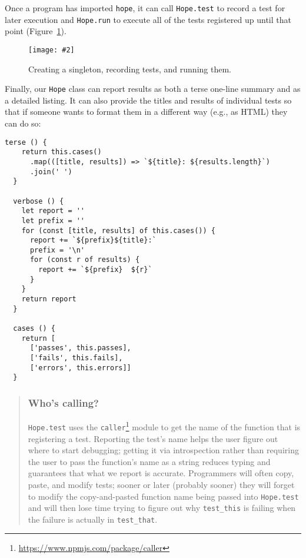 \documentclass[krantzl]{krantz}
\newcommand{\figpdf}[4]{\begin{figure}%
\centering%
\texttt{[image: \#2]}%
\caption{#3}%
\label{#1}%
\end{figure}}
\newcommand{\figref}[1]{Figure~\ref{#1}}
\newenvironment{callout}{\savenotes\begin{tBox}\begin{quotation}\toggletrue{inbox}\renewcommand{\thempfootnote}{\arabic{footnote}}}{\end{quotation}\vspace{\baselineskip}\end{tBox}\togglefalse{inbox}\spewnotes}
\newcommand{\hreffoot}[2]{{#1}\footnote{\href{#2}{#2}}}
\begin{document}
Once a program has imported \texttt{hope},
it can call \texttt{Hope.test} to record a test for later execution
and \texttt{Hope.run} to execute all of the tests registered up until that point
(\figref{unit-test-hope-structure}).

\figpdf{unit-test-hope-structure}{./unit-test/hope-structure.pdf}{Creating a singleton, recording tests, and running them.}{0.6}


\newpage


Finally,
our \texttt{Hope} class can report results as both a terse one-line summary and as a detailed listing.
It can also provide the titles and results of individual tests
so that if someone wants to format them in a different way (e.g., as HTML) they can do so:


\begin{lstlisting}[frame=tblr]
  terse () {
    return this.cases()
      .map(([title, results]) => `${title}: ${results.length}`)
      .join(' ')
  }

  verbose () {
    let report = ''
    let prefix = ''
    for (const [title, results] of this.cases()) {
      report += `${prefix}${title}:`
      prefix = '\n'
      for (const r of results) {
        report += `${prefix}  ${r}`
      }
    }
    return report
  }

  cases () {
    return [
      ['passes', this.passes],
      ['fails', this.fails],
      ['errors', this.errors]]
  }
\end{lstlisting}


\begin{callout}


\subsubsection*{Who’s calling?}


\texttt{Hope.test} uses the \hreffoot{\texttt{caller}}{https://www.npmjs.com/package/caller} module
to get the name of the function that is registering a test.
Reporting the test’s name helps the user figure out where to start debugging;
getting it via introspection
rather than requiring the user to pass the function’s name as a string
reduces typing
and guarantees that what we report is accurate.
Programmers will often copy, paste, and modify tests;
sooner or later (probably sooner) they will forget to modify
the copy-and-pasted function name being passed into \texttt{Hope.test}
and will then lose time trying to figure out why \texttt{test\_this} is failing
when the failure is actually in \texttt{test\_that}.

\end{callout}
\end{document}
